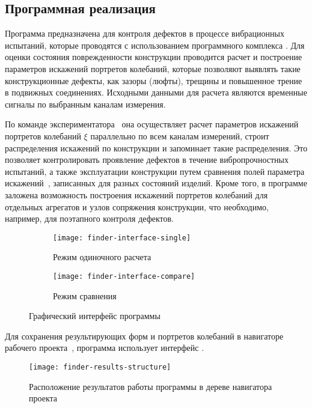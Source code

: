 \subsection{Программная реализация}

Программа предназначена для контроля дефектов в процессе вибрационных испытаний, которые проводятся с использованием программного комплекса . Для оценки состояния поврежденности конструкции проводится расчет и построение параметров искажений портретов колебаний, которые позволяют выявлять такие конструкционные дефекты, как зазоры (люфты), трещины и повышенное трение в подвижных соединениях. Исходными данными для расчета являются временные сигналы по выбранным каналам измерения. 

По команде экспериментатора~ она осуществляет расчет параметров искажений портретов колебаний $ \xi $ параллельно по всем каналам измерений, строит распределения искажений по конструкции и запоминает такие распределения. Это позволяет контролировать проявление дефектов в течение вибропрочностных испытаний, а также эксплуатации конструкции путем сравнения полей параметра искажений~, записанных для разных состояний изделий. Кроме того, в программе заложена возможность построения искажений портретов колебаний для отдельных агрегатов и узлов сопряжения конструкции, что необходимо, например, для поэтапного контроля дефектов.

\begin{figure}[!htb]
	\centering
	\begin{subfigure}{0.49\textwidth}
		\texttt{[image: finder-interface-single]}
		\caption{Режим одиночного расчета} \label{subfig:finder-interface-single}
	\end{subfigure}
	\hfill
	\begin{subfigure}{0.49\textwidth}
		\texttt{[image: finder-interface-compare]} 
		\caption{Режим сравнения} \label{subfig:finder-interface-compare}
	\end{subfigure}
    \caption{Графический интерфейс программы} 
\end{figure}

Для сохранения результирующих форм и портретов колебаний в навигаторе рабочего проекта~, программа использует интерфейс .

\begin{figure}[H]
	\centerfloat
	\texttt{[image: finder-results-structure]}
	\caption{Расположение результатов работы программы в дереве навигатора проекта } \label{fig:finder-results-structure}
\end{figure}


